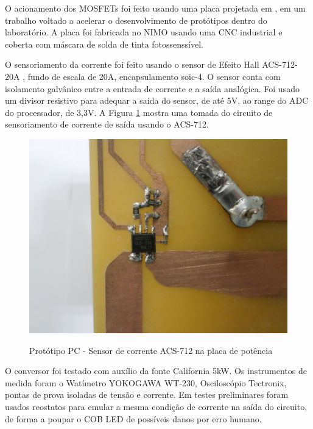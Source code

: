 \documentclass[
        12pt,
        openany, %
        oneside, %
        a4paper,			
        english,			
        brazil
        ]{abntbibufjf}
\begin{document}
O acionamento dos MOSFETs foi feito usando uma placa projetada em \cite{livinha}, em um trabalho voltado a acelerar o desenvolvimento de protótipos dentro do laboratório. A placa foi fabricada no NIMO usando uma CNC industrial e coberta com máscara de solda de tinta fotossenssível.%


O sensoriamento da corrente foi feito usando o sensor de Efeito Hall ACS-712-20A \cite{acs}, fundo de escala de 20A, encapsulamento soic-4. O sensor conta com isolamento galvânico entre a entrada de corrente e a saída analógica. Foi usado um divisor resistivo para adequar a saída do sensor, de até 5V, ao range do ADC do processador, de 3,3V. A Figura \ref{acs-board} mostra uma tomada do circuito de sensoriamento de corrente de saída usando o ACS-712.


\begin{figure}[!h]
	\centering
	\caption{Protótipo PC - Sensor de corrente ACS-712 na placa de potência}
	\includegraphics[scale=.3]{../FOTOGRAFIAS/D2.jpg}\\
	\label{acs-board}
\end{figure}


O conversor foi testado com auxílio da fonte California 5kW. Os instrumentos de medida foram o Watímetro YOKOGAWA WT-230, Osciloscópio Tectronix, pontas de prova isoladas de tensão e corrente. Em testes preliminares foram usados reostatos para emular a mesma condição de corrente na saída do circuito, de forma a poupar o COB LED de possíveis danos por erro humano.
\end{document}

